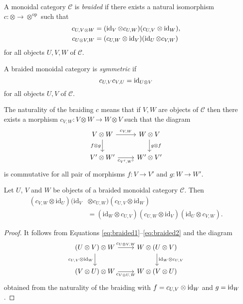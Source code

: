 \documentclass[12pt]{amsproc}
\begin{document}
\begin{definition}
A monoidal category $\mathcal{C}$ is \emph{braided} if there
exists a natural isomorphism $c:\otimes\to\otimes^{\mathrm{op}}$
such that
\begin{align}
c_{U,V\otimes W} & =(\operatorname{id}_{V}\otimes c_{U,W})(c_{U,V}\otimes\operatorname{id}_{W}),\label{eq:braided1}\\
c_{U\otimes V,W} & =(c_{U,W}\otimes\operatorname{id}_{V})(\operatorname{id}_{U}\otimes c_{V,W})\label{eq:braided2}
\end{align}
for all objects $U,V,W$ of $\mathcal{C}$. 
\end{definition}

\begin{definition}
A braided monoidal category is \emph{symmetric} if 
\[
c_{U,V}c_{V,U}=\operatorname{id}_{U\otimes V}
\]
for all objects $U,V$ of $\mathcal{C}$.
\end{definition}

The naturality of the braiding $c$ means that if $V,W$ are objects
of $\mathcal{C}$ then there exists a morphism $c_{V,W}:V\otimes W\to W\otimes V$
such that the diagram 
\[
\begin{tikzcd}
V \otimes W \arrow[d, "f \otimes g"'] \arrow[r, "c_{V,W}"] & W \otimes V \arrow[d, "g \otimes f"] \\
V' \otimes W' \arrow[r, "c_{V',W'}"'] & W' \otimes V'
\end{tikzcd}
\]
is commutative for all pair of morphisms $f:V\to V'$ and $g:W\to W'$.

\begin{proposition}
Let $U$, $V$ and $W$ be objects of a braided monoidal category $\mathcal{C}$.
Then 
\begin{align*}
(c_{V,W}\otimes\textrm{id}_{U})(\textrm{id}_{V}&\otimes c_{U,W})(c_{U,V}\otimes\textrm{id}_{W})\\
&=(\textrm{id}_{W}\otimes c_{U,V})(c_{U,W}\otimes\textrm{id}_{V})(\textrm{id}_{U}\otimes c_{V,W}).
\end{align*}
\end{proposition}

\begin{proof}
It follows from Equations \eqref{eq:braided1}--\eqref{eq:braided2} and the
diagram
\[
\begin{tikzcd}
(U \otimes V) \otimes W \arrow[d, "c_{U,V} \otimes \mathrm{id}_W"'] \arrow[r, "c_{U \otimes V, W}"] 
  & W \otimes (U \otimes V) \arrow[d, "\mathrm{id}_W \otimes c_{U,V}"] \\
(V \otimes U) \otimes W \arrow[r, "c_{V \otimes U, W}"'] 
  & W \otimes (V \otimes U)
\end{tikzcd}
\]
obtained from the naturality of the braiding with
$f=c_{U,V}\otimes\operatorname{id}_W$ and $g=\operatorname{id}_W$.
\end{proof}
\end{document}
